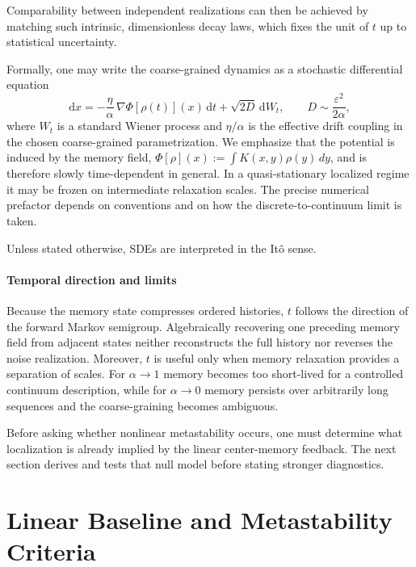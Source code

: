 \documentclass[reprint,amsmath,amssymb,aps,prd,nofootinbib,floatfix]{revtex4-2}
\begin{document}
Comparability between independent realizations can then be achieved by matching such intrinsic, dimensionless decay laws, which fixes the unit of $t$ up to statistical uncertainty.

Formally, one may write the coarse-grained dynamics as a stochastic differential equation
\begin{equation}\label{eq:coarse_sde}
\mathrm{d}x = -\frac{\eta}{\alpha}\,\nabla\Phi[\rho(t)](x)\,\mathrm{d}t + \sqrt{2D}\,\mathrm{d}W_t,
\qquad
D \sim \frac{\varepsilon^2}{2\alpha},
\end{equation}
where $W_t$ is a standard Wiener process \cite{Oksendal2003,Risken1996} and $\eta/\alpha$ is the effective drift coupling in the chosen coarse-grained parametrization. We emphasize that the potential is induced by the memory field, $\Phi[\rho](x):=\int K(x,y)\rho(y)\,dy$, and is therefore slowly time-dependent in general.
In a quasi-stationary localized regime it may be frozen on intermediate relaxation scales. The precise numerical prefactor depends on conventions and on how the discrete-to-continuum limit is taken.

Unless stated otherwise, SDEs are interpreted in the It\^o sense.


\paragraph{Temporal direction and limits}
Because the memory state compresses ordered histories, $t$ follows the direction of the forward Markov semigroup. Algebraically recovering one preceding memory field from adjacent states neither reconstructs the full history nor reverses the noise realization.
Moreover, $t$ is useful only when memory relaxation provides a separation of scales.
For $\alpha\to 1$ memory becomes too short-lived for a controlled continuum description, while for $\alpha\to 0$ memory persists over arbitrarily long sequences and the coarse-graining becomes ambiguous.

Before asking whether nonlinear metastability occurs, one must determine what localization is already implied by the linear center-memory feedback.
The next section derives and tests that null model before stating stronger diagnostics.

\section{Linear Baseline and Metastability Criteria}
\end{document}
